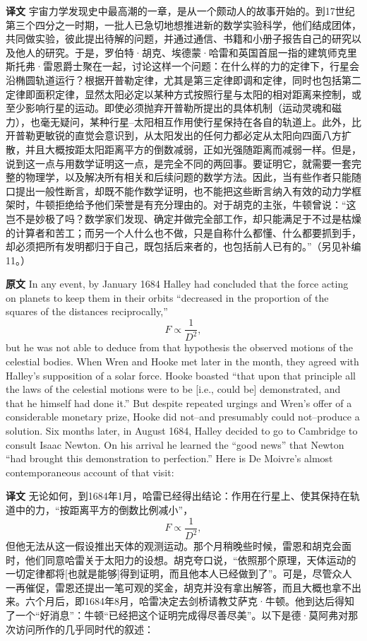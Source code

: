 \documentclass[UTF8,zihao=-4]{ctexart}
\begin{document}
\par\noindent\textbf{译文} 宇宙力学发现史中最高潮的一章，是从一个颇动人的故事开始的。到17世纪第三个四分之一时期，一批人已急切地想推进新的数学实验科学，他们结成团体，共同做实验，彼此提出待解的问题，并通过通信、书籍和小册子报告自己的研究以及他人的研究。于是，罗伯特·胡克、埃德蒙·哈雷和英国首屈一指的建筑师克里斯托弗·雷恩爵士聚在一起，讨论这样一个问题：在什么样的力的定律下，行星会沿椭圆轨道运行？根据开普勒定律，尤其是第三定律即调和定律，同时也包括第二定律即面积定律，显然太阳必定以某种方式按照行星与太阳的相对距离来控制，或至少影响行星的运动。即使必须抛弃开普勒所提出的具体机制（运动灵魂和磁力），也毫无疑问，某种行星--太阳相互作用使行星保持在各自的轨道上。此外，比开普勒更敏锐的直觉会意识到，从太阳发出的任何力都必定从太阳向四面八方扩散，并且大概按距太阳距离平方的倒数减弱，正如光强随距离而减弱一样。但是，说到这一点与用数学证明这一点，是完全不同的两回事。要证明它，就需要一套完整的物理学，以及解决所有相关和后续问题的数学方法。因此，当有些作者只能随口提出一般性断言，却既不能作数学证明，也不能把这些断言纳入有效的动力学框架时，牛顿拒绝给予他们荣誉是有充分理由的。对于胡克的主张，牛顿曾说：“这岂不是妙极了吗？数学家们发现、确定并做完全部工作，却只能满足于不过是枯燥的计算者和苦工；而另一个人什么也不做，只是自称什么都懂、什么都要抓到手，却必须把所有发明都归于自己，既包括后来者的，也包括前人已有的。”（另见补编11。）
\medskip

\noindent\textbf{原文} In any event, by January 1684 Halley had concluded that the force acting on planets to keep them in their orbits ``decreased in the proportion of the squares of the distances reciprocally,''
\[
F \propto \frac{1}{D^{2}},
\]
but he was not able to deduce from that hypothesis the observed motions of the celestial bodies. When Wren and Hooke met later in the month, they agreed with Halley's supposition of a solar force. Hooke boasted ``that upon that principle all the laws of the celestial motions were to be [i.e., could be] demonstrated, and that he himself had done it.'' But despite repeated urgings and Wren's offer of a considerable monetary prize, Hooke did not--and presumably could not--produce a solution. Six months later, in August 1684, Halley decided to go to Cambridge to consult Isaac Newton. On his arrival he learned the ``good news'' that Newton ``had brought this demonstration to perfection.'' Here is De Moivre's almost contemporaneous account of that visit:
\par\noindent\textbf{译文} 无论如何，到1684年1月，哈雷已经得出结论：作用在行星上、使其保持在轨道中的力，“按距离平方的倒数比例减小”，
\[
F \propto \frac{1}{D^{2}},
\]
但他无法从这一假设推出天体的观测运动。那个月稍晚些时候，雷恩和胡克会面时，他们同意哈雷关于太阳力的设想。胡克夸口说，“依照那个原理，天体运动的一切定律都将[也就是能够]得到证明，而且他本人已经做到了”。可是，尽管众人一再催促，雷恩还提出一笔可观的奖金，胡克并没有拿出解答，而且大概也拿不出来。六个月后，即1684年8月，哈雷决定去剑桥请教艾萨克·牛顿。他到达后得知了一个“好消息”：牛顿“已经把这个证明完成得尽善尽美”。以下是德·莫阿弗对那次访问所作的几乎同时代的叙述：
\medskip
\end{document}
